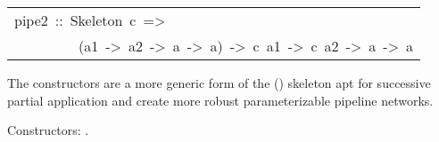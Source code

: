 \begin{haddockdesc}
\item[\begin{tabular}{@{}l}
pipe2\ ::\ Skeleton\ c\ =>\\\ \ \ \ \ \ \ \ \ (a1\ ->\ a2\ ->\ a\ ->\ a)\ ->\ c\ a1\ ->\ c\ a2\ ->\ a\ ->\ a
\end{tabular}]\haddockbegindoc
The  constructors are a more generic form of the \haddockid{=<<=}
 () skeleton apt for successive partial application and create
 more robust parameterizable pipeline networks.\par
Constructors: .\par
{}
 \par

\end{haddockdesc}